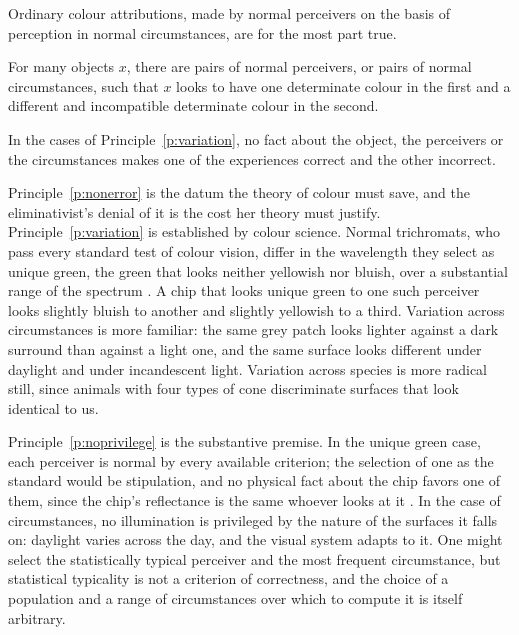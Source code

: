 \documentclass{situationist-preprint}
\begin{document}
\begin{principle}\label{p:nonerror}
Ordinary colour attributions, made by normal perceivers on the basis of perception in normal circumstances, are for the most part true.
\end{principle}

\begin{principle}[Variation]\label{p:variation}
For many objects $x$, there are pairs of normal perceivers, or pairs of normal circumstances, such that $x$ looks to have one determinate colour in the first and a different and incompatible determinate colour in the second.
\end{principle}

\begin{principle}[No privilege]\label{p:noprivilege}
In the cases of Principle~\ref{p:variation}, no fact about the object, the perceivers or the circumstances makes one of the experiences correct and the other incorrect.
\end{principle}

Principle~\ref{p:nonerror} is the datum the theory of colour must save, and the eliminativist's denial of it is the cost her theory must justify. Principle~\ref{p:variation} is established by colour science. Normal trichromats, who pass every standard test of colour vision, differ in the wavelength they select as unique green, the green that looks neither yellowish nor bluish, over a substantial range of the spectrum \citep{Hardin1988}. A chip that looks unique green to one such perceiver looks slightly bluish to another and slightly yellowish to a third. Variation across circumstances is more familiar: the same grey patch looks lighter against a dark surround than against a light one, and the same surface looks different under daylight and under incandescent light. Variation across species is more radical still, since animals with four types of cone discriminate surfaces that look identical to us.

Principle~\ref{p:noprivilege} is the substantive premise. In the unique green case, each perceiver is normal by every available criterion; the selection of one as the standard would be stipulation, and no physical fact about the chip favors one of them, since the chip's reflectance is the same whoever looks at it \citep{Cohen2009}. In the case of circumstances, no illumination is privileged by the nature of the surfaces it falls on: daylight varies across the day, and the visual system adapts to it. One might select the statistically typical perceiver and the most frequent circumstance, but statistical typicality is not a criterion of correctness, and the choice of a population and a range of circumstances over which to compute it is itself arbitrary.
\end{document}
